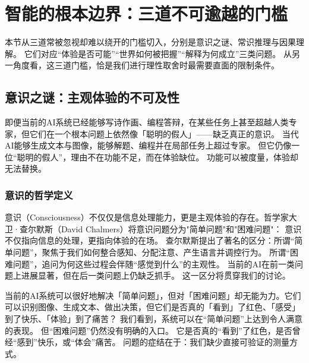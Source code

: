 \section{智能的根本边界：三道不可逾越的门槛}

本节从三道常被忽视却难以绕开的门槛切入，分别是意识之谜、常识推理与因果理解。
它们对应“体验是否可能”“世界如何被把握”“解释为何成立”三类问题。
从另一角度看，这三道门槛，恰是我们进行理性取舍时最需要直面的限制条件。



\subsection{意识之谜：主观体验的不可及性}

即便当前的AI系统已经能够写诗作画、编程答辩，在某些任务上甚至超越人类专家，但它们在一个根本问题上依然像「聪明的假人」——缺乏真正的意识。
当代AI能够生成文本与图像，能够解题、编程并在局部任务上超过专家。
但它仍像一位“聪明的假人”，理由不在功能不足，而在体验缺位。
功能可以被度量，体验却无法替换。



\subsubsection{意识的哲学定义}

意识（Consciousness）不仅仅是信息处理能力，更是主观体验的存在。哲学家大卫·查尔默斯（David Chalmers）将意识问题分为"简单问题"和"困难问题"：
意识不仅指向信息的处理，更指向体验的在场。
查尔默斯提出了著名的区分：所谓“简单问题”，聚焦于我们如何整合感知、分配注意、产生语言并调控行为。
所谓“困难问题”，追问为何这些过程会伴随“感觉到什么”的主观性。
当前的AI在前一类问题上进展显著，但在后一类问题上仍缺乏抓手。
这一区分将贯穿我们的讨论。

当前的AI系统可以很好地解决「简单问题」，但对「困难问题」却无能为力。它们可以识别图像、生成文本、做出决策，但它们是否真的「看到」了红色、「感受」到了快乐、「体验」到了痛苦？
我们看到，系统可以在“简单问题”上达到令人满意的表现。
但“困难问题”仍然没有明确的入口。
它是否真的“看到”了红色，是否曾经“感到”快乐，或“体会”痛苦。
问题的症结在于：我们缺少直接可验证的测量方式。



